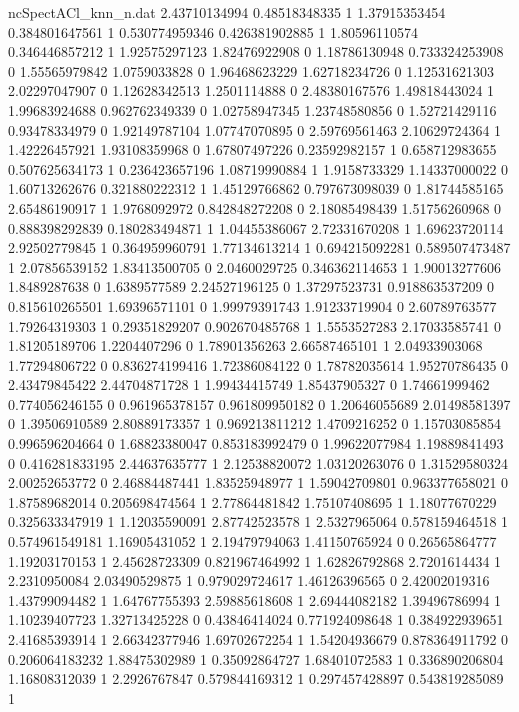 \begin{filecontents}{ncSpectACl_knn_n.dat}
2.43710134994 0.48518348335 1
1.37915353454 0.384801647561 1
0.530774959346 0.426381902885 1
1.80596110574 0.346446857212 1
1.92575297123 1.82476922908 0
1.18786130948 0.733324253908 0
1.55565979842 1.0759033828 0
1.96468623229 1.62718234726 0
1.12531621303 2.02297047907 0
1.12628342513 1.2501114888 0
2.48380167576 1.49818443024 1
1.99683924688 0.962762349339 0
1.02758947345 1.23748580856 0
1.52721429116 0.93478334979 0
1.92149787104 1.07747070895 0
2.59769561463 2.10629724364 1
1.42226457921 1.93108359968 0
1.67807497226 0.23592982157 1
0.658712983655 0.507625634173 1
0.236423657196 1.08719990884 1
1.9158733329 1.14337000022 0
1.60713262676 0.321880222312 1
1.45129766862 0.797673098039 0
1.81744585165 2.65486190917 1
1.9768092972 0.842848272208 0
2.18085498439 1.51756260968 0
0.888398292839 0.180283494871 1
1.04455386067 2.72331670208 1
1.69623720114 2.92502779845 1
0.364959960791 1.77134613214 1
0.694215092281 0.589507473487 1
2.07856539152 1.83413500705 0
2.0460029725 0.346362114653 1
1.90013277606 1.8489287638 0
1.6389577589 2.24527196125 0
1.37297523731 0.918863537209 0
0.815610265501 1.69396571101 0
1.99979391743 1.91233719904 0
2.60789763577 1.79264319303 1
0.29351829207 0.902670485768 1
1.5553527283 2.17033585741 0
1.81205189706 1.2204407296 0
1.78901356263 2.66587465101 1
2.04933903068 1.77294806722 0
0.836274199416 1.72386084122 0
1.78782035614 1.95270786435 0
2.43479845422 2.44704871728 1
1.99434415749 1.85437905327 0
1.74661999462 0.774056246155 0
0.961965378157 0.961809950182 0
1.20646055689 2.01498581397 0
1.39506910589 2.80889173357 1
0.969213811212 1.4709216252 0
1.15703085854 0.996596204664 0
1.68823380047 0.853183992479 0
1.99622077984 1.19889841493 0
0.416281833195 2.44637635777 1
2.12538820072 1.03120263076 0
1.31529580324 2.00252653772 0
2.46884487441 1.83525948977 1
1.59042709801 0.963377658021 0
1.87589682014 0.205698474564 1
2.77864481842 1.75107408695 1
1.18077670229 0.325633347919 1
1.12035590091 2.87742523578 1
2.5327965064 0.578159464518 1
0.574961549181 1.16905431052 1
2.19479794063 1.41150765924 0
0.26565864777 1.19203170153 1
2.45628723309 0.821967464992 1
1.62826792868 2.7201614434 1
2.2310950084 2.03490529875 1
0.979029724617 1.46126396565 0
2.42002019316 1.43799094482 1
1.64767755393 2.59885618608 1
2.69444082182 1.39496786994 1
1.10239407723 1.32713425228 0
0.43846414024 0.771924098648 1
0.384922939651 2.41685393914 1
2.66342377946 1.69702672254 1
1.54204936679 0.878364911792 0
0.206064183232 1.88475302989 1
0.35092864727 1.68401072583 1
0.336890206804 1.16808312039 1
2.2926767847 0.579844169312 1
0.297457428897 0.543819285089 1

\end{filecontents}
